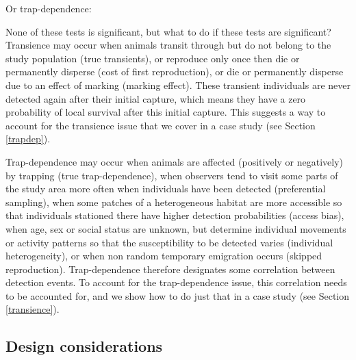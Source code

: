 \documentclass[
  12pt,
]{krantz}
\newenvironment{Shaded}{\begin{snugshade}}{\end{snugshade}}
\newcommand{\DocumentationTok}[1]{\textcolor[rgb]{0.56,0.35,0.01}{\textbf{\textit{#1}}}}
\newcommand{\FunctionTok}[1]{\textcolor[rgb]{0.13,0.29,0.53}{\textbf{#1}}}
\newcommand{\NormalTok}[1]{#1}
\begin{document}
Or trap-dependence:

\begin{Shaded}
\end{Shaded}

None of these tests is significant, but what to do if these tests are significant? Transience may occur when animals transit through but do not belong to the study population (true transients), or reproduce only once then die or permanently disperse (cost of first reproduction), or die or permanently disperse due to an effect of marking (marking effect). These transient individuals are never detected again after their initial capture, which means they have a zero probability of local survival after this initial capture. This suggests a way to account for the transience issue that we cover in a case study (see Section \ref{trapdep}).

Trap-dependence may occur when animals are affected (positively or negatively) by trapping (true trap-dependence), when observers tend to visit some parts of the study area more often when individuals have been detected (preferential sampling), when some patches of a heterogeneous habitat are more accessible so that individuals stationed there have higher detection probabilities (access bias), when age, sex or social status are unknown, but determine individual movements or activity patterns so that the susceptibility to be detected varies (individual heterogeneity), or when non random temporary emigration occurs (skipped reproduction). Trap-dependence therefore designates some correlation between detection events. To account for the trap-dependence issue, this correlation needs to be accounted for, and we show how to do just that in a case study (see Section \ref{transience}).

\subsection{Design considerations}\label{design-considerations}
\end{document}
